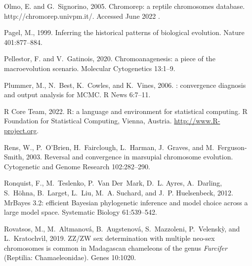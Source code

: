 \documentclass[a4paper, 12pt]{article}
\begin{document}
\begin{thebibliography}{73}
{
Olmo, E. and G.~Signorino, 2005.
\newblock Chromorep: a reptile chromosomes database.
  http://chromorep.univpm.it/. {A}ccessed {J}une 2022 .

Pagel, M., 1999.
\newblock Inferring the historical patterns of biological evolution.
\newblock Nature 401:877--884.

Pellestor, F. and V.~Gatinois, 2020.
\newblock Chromoanagenesis: a piece of the macroevolution scenario.
\newblock Molecular Cytogenetics 13:1--9.

Plummer, M., N.~Best, K.~Cowles, and K.~Vines, 2006.
: convergence diagnosis and output analysis for {MCMC}.
\newblock R News 6:7--11.

{R Core Team}, 2022.
\newblock R: a language and environment for statistical computing.
\newblock R Foundation for Statistical Computing, Vienna, Austria.
\newblock \urlprefix\url{http://www.R-project.org}.

Rens, W., P.~O'Brien, H.~Fairclough, L.~Harman, J.~Graves, and
  M.~Ferguson-Smith, 2003.
\newblock Reversal and convergence in marsupial chromosome evolution.
\newblock Cytogenetic and Genome Research 102:282--290.

Ronquist, F., M.~Teslenko, P.~Van Der~Mark, D.~L. Ayres, A.~Darling,
  S.~H{\"o}hna, B.~Larget, L.~Liu, M.~A. Suchard, and J.~P. Huelsenbeck, 2012.
\newblock Mr{B}ayes 3.2: efficient {B}ayesian phylogenetic inference and model
  choice across a large model space.
\newblock Systematic Biology 61:539--542.

Rovatsos, M., M.~Altmanov{\'a}, B.~Augstenov{\'a}, S.~Mazzoleni,
  P.~Velensk{\`y}, and L.~Kratochv{\'\i}l, 2019.
\newblock Z{Z}/{ZW} sex determination with multiple neo-sex chromosomes is
  common in {M}adagascan chameleons of the genus \textit{{F}urcifer}
  ({R}eptilia: {C}hamaeleonidae).
\newblock Genes 10:1020.

}
\end{thebibliography}
\end{document}
